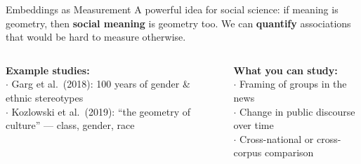 \documentclass[aspectratio=169]{beamer}
\begin{document}
\begin{frame}{Embeddings as Measurement}
\vspace{0.2cm}
{\small A powerful idea for social science: if meaning is geometry, then \textbf{social
meaning} is geometry too. We can \textbf{quantify} associations that would be hard to
measure otherwise.}

\medskip
{}

\medskip
\begin{columns}[T]
  \vspace{0pt}
  {\small\textbf{Example studies:}}\\[3pt]
  {\small
  \textcolor{wurgreen}{$\cdot$} Garg et al.\ (2018): 100 years of gender \& ethnic stereotypes\\[3pt]
  \textcolor{wurgreen}{$\cdot$} Kozlowski et al.\ (2019): ``the geometry of culture'' --- class, gender, race}

  \vspace{0pt}
  {\small\textbf{What you can study:}}\\[3pt]
  {\small
  \textcolor{wurgreen}{$\cdot$} Framing of groups in the news\\[3pt]
  \textcolor{wurgreen}{$\cdot$} Change in public discourse over time\\[3pt]
  \textcolor{wurgreen}{$\cdot$} Cross-national or cross-corpus comparison}
\end{columns}
\end{frame}
\end{document}
